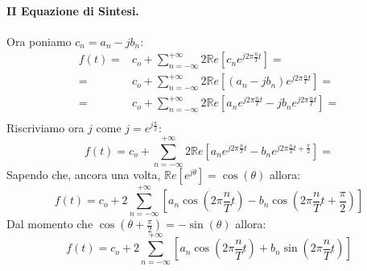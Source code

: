 \paragraph{II Equazione di Sintesi.} Ora poniamo $c_n = a_n - jb_n$:
\begin{align*}
    f(t) =& c_o + \sum_{n = -\infty}^{+\infty} 2\mathbb{R}e \left[c_n e^{j2\pi \frac{n}{T}t}\right] =\\
         =& c_o + \sum_{n = -\infty}^{+\infty} 2\mathbb{R}e \left[(a_n - jb_n) e^{j2\pi \frac{n}{T}t}\right] =\\
         =& c_o + \sum_{n = -\infty}^{+\infty} 2\mathbb{R}e \left[a_n e^{j2\pi \frac{n}{T}t} - jb_n e^{j2\pi \frac{n}{T}t}\right] =\\
\end{align*}
Riscriviamo ora $j$ come $j = e^{j \frac{\pi}{2}}$:
\begin{equation*}
    f(t) = c_o + \sum_{n = -\infty}^{+\infty} 2\mathbb{R}e \left[a_n e^{j2\pi \frac{n}{T}t} - b_n e^{j2\pi \frac{n}{T}t + \frac{\pi}{2}}\right] =
\end{equation*}
Sapendo che, ancora una volta, $\mathbb{R}e[e^{j\theta}] = \cos(\theta)$ allora:
\begin{equation*}
    f(t) = c_o + 2\sum_{n = -\infty}^{+\infty} \left[a_n \cos\left(2\pi \frac{n}{T}t\right) - b_n \cos\left(2\pi \frac{n}{T}t + \frac{\pi}{2}\right)\right]
\end{equation*}
Dal momento che $\cos\left(\theta + \frac{\pi}{2}\right) = -\sin(\theta)$ allora:
\begin{equation}
    f(t) = c_o + 2\sum_{n = -\infty}^{+\infty} \left[a_n \cos\left(2\pi \frac{n}{T}t\right) + b_n \sin\left(2\pi \frac{n}{T}t\right)\right]
\end{equation}